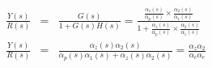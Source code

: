 
\begin{eqnarray*}
	\frac{Y(s)}{R(s)} &=& \frac{G(s)}{1+G(s)H(s)}= \frac{\frac{\alpha_z(s)}{\alpha_p(s)}\times\frac{\alpha_2(s)}{\alpha_1(s)}}{1+\frac{\alpha_z(s)}{\alpha_p(s)}\times\frac{\alpha_2(s)}{\alpha_1(s)}} \\
	\frac{Y(s)}{R(s)} &=& \frac{\alpha_z(s)\alpha_2(s)}{\alpha_p(s)\alpha_1(s)+\alpha_z(s)\alpha_2(s)}=\frac{\alpha_z\alpha_2}{\alpha_c\alpha_e}
\end{eqnarray*}
 



\endinput

